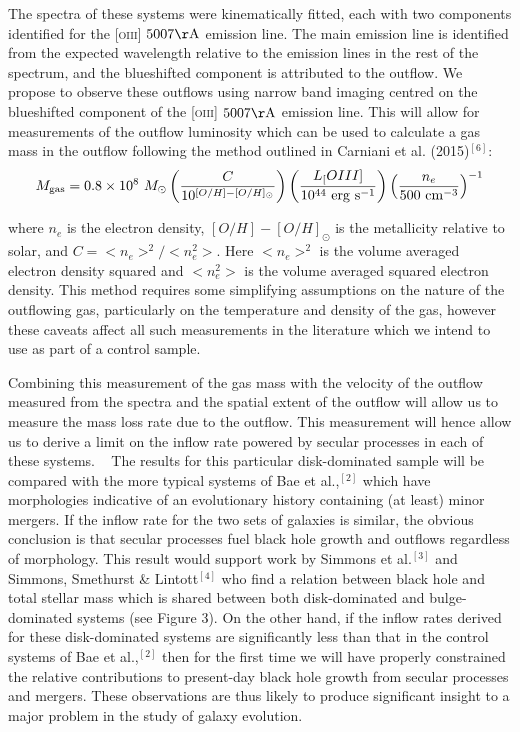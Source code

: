 \documentclass[12pt]{article}
\begin{document}
The spectra of these systems were kinematically fitted, each with two components identified for the \textsc{[oiii]} $5007\rm{\AA}$ emission line. The main emission line is identified from the expected wavelength relative to the emission lines in the rest of the spectrum, and the blueshifted component is attributed to the outflow. We propose to observe these outflows using narrow band imaging centred on the blueshifted component of the \textsc{[oiii]} $5007\rm{\AA}$ emission line. This will allow for measurements of the outflow luminosity which can be used to calculate a gas mass in the outflow following the method outlined in Carniani et al. (2015)$^{[6]}$:
\begin{equation}
M_{\rm{gas}} = 0.8 \times 10^8~M_{\odot} \left( \frac{C}{10^{[O/H] - [O/H]_{\odot}}} \right) \left( \frac{L_[OIII]}{10^{44}~\rm{erg}~\rm{s}^{-1}} \right) \left( \frac{n_e}{500~\rm{cm}^{-3}} \right)^{-1}
\end{equation}

where $n_e$ is the electron density, $[O/H] - [O/H]_{\odot}$ is the metallicity relative to solar, and $C = <n_e>^2 / <n_e^2>$. Here $<n_e>^2$ is the volume averaged electron density squared and $<n_e^2>$ is the volume averaged squared electron density. This method requires some simplifying assumptions on the nature of the outflowing gas, particularly on the temperature and density of the gas, however these caveats affect all such measurements in the literature which we intend to use as part of a control sample. 
\vspace{0.25em}

Combining this measurement of the gas mass with the velocity of the outflow measured from the spectra and the spatial extent of the outflow will allow us to measure the mass loss rate due to the outflow. This measurement will hence allow us to derive a limit on the inflow rate powered by secular processes in each of these systems. 
\vspace{0.25em}
 
The results for this particular disk-dominated sample will be compared with the more typical systems of Bae et al.,$^{[2]}$ which have morphologies indicative of an evolutionary history containing (at least) minor mergers. If the inflow rate for the two sets of galaxies is similar, the obvious conclusion is that secular processes fuel black hole growth and outflows regardless of morphology. This result would support work by Simmons et al.$^{[3]}$ and Simmons, Smethurst \& Lintott$^{[4]}$ who find a relation between black hole and total stellar mass which is shared between both disk-dominated and bulge-dominated systems (see Figure 3). On the other hand, if the inflow rates derived for these disk-dominated systems are significantly less than that in the control systems of Bae et al.,$^{[2]}$ then for the first time we will have properly constrained the relative contributions to present-day black hole growth from secular processes and mergers. These observations are thus likely to produce significant insight to a major problem in the study of galaxy evolution. 
\vspace{1.5em}
\end{document}
